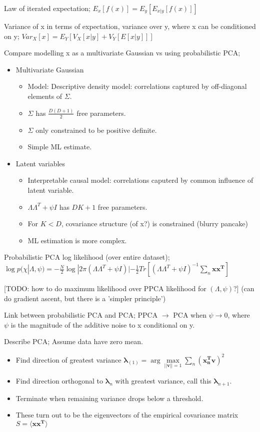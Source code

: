 \documentclass{article}
\begin{document}
Law of iterated expectation; $E_x[f(x)] = E_y[E_{x|y}[f(x)]]$

Variance of x in terms of expectation, variance over y, where x can be conditioned on y; $Var_X[x] = E_Y[V_X[x|y] + V_Y[E[x|y]]]$

Compare modelling x as a multivariate Gaussian vs using probabilistic PCA; \begin{itemize}\item Multivariate Gaussian \begin{itemize} \item Model: Descriptive density model: correlations captured by off-diagonal elements of $\Sigma$.  \item $\Sigma$ has $\frac{D(D+1)}{2}$ free parameters.  \item $\Sigma$ only constrained to be positive definite.  \item Simple ML estimate.  \end{itemize} \item Latent variables \begin{itemize} \item Interpretable causal model: correlations caputerd by common influence of latent variable.  \item $\Lambda\Lambda^T +\psi I$ has $DK+1$ free parameters.  \item For $K < D$, covariance structure (of x?) is constrained (blurry pancake) \item ML estimation is more complex.  \end{itemize} \end{itemize}

Probabilistic PCA log likelihood (over entire dataset); $\log p(\chi | \Lambda, \psi) = -\frac{N}{2}\log|2\pi(\Lambda\Lambda^T+\psi I)|-\frac{1}{2}Tr[(\Lambda\Lambda^T+\psi I)^{-1}\sum_n\mathbf{x x^T}]$

[TODO: how to do maximum likelihood over PPCA likelihood for $(\Lambda, \psi)$?] (can do gradient ascent, but there is a 'simpler principle')

Link between probabilistic PCA and PCA; PPCA $\to$ PCA when $\psi\to 0$, where $\psi$ is the magnitude of the additive noise to x conditional on y.

Describe PCA; Assume data have zero mean. \begin{itemize} \item Find direction of greatest variance $\mathbf{\lambda}_{(1)}=\arg\max\limits_{||\mathbf{v}||=1}\sum_n(\mathbf{x^T_nv})^2$ \item Find direction orthogonal to $\mathbf{\lambda}_{n}$ with greatest variance, call this  $\mathbf{\lambda}_{n+1}$.  \item Terminate when remaining variance drops below a threshold.  \item These turn out to be the eigenvectors of the empirical covariance matrix $S=\langle \mathbf{xx^T} \rangle$ \end{itemize}
\end{document}
